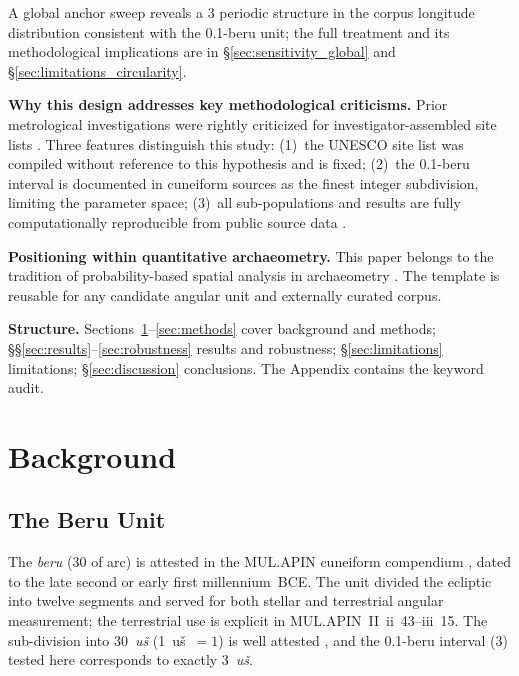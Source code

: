 \documentclass[HARVARD,twocolumn]{USG}
\begin{document}
A global anchor sweep reveals a 3\textdegree{} periodic structure in the
corpus longitude distribution consistent with the 0.1-beru unit; the full
treatment and its methodological implications are in
\S\ref{sec:sensitivity_global} and \S\ref{sec:limitations_circularity}.
\label{sec:circularity}

\textbf{Why this design addresses key methodological criticisms.}
Prior metrological investigations were rightly criticized for investigator-assembled
site lists \citep{williamson1983leylines,freeman1976,kendall1974}.
Three features distinguish this study: (1)~the UNESCO site list was compiled
without reference to this hypothesis and is fixed; (2)~the 0.1-beru interval
is documented in cuneiform sources \citep{hunger2019mul} as the finest
integer subdivision, limiting the parameter space; (3)~all sub-populations 
and results are fully computationally reproducible from public source 
data \citep{tenenbaum2026audit}.

\textbf{Positioning within quantitative archaeometry.}
This paper belongs to the tradition of probability-based spatial analysis in
archaeometry \citep{magli2013,magli2016,ruggles1999astronomy,ruggles2015handbook,silva2020statistical}. 
The template is reusable for any candidate angular unit
and externally curated corpus.

\textbf{Structure.}
Sections~\ref{sec:prior}--\ref{sec:methods} cover background and methods;
\S\S\ref{sec:results}--\ref{sec:robustness} results and robustness;
\S\ref{sec:limitations} limitations;
\S\ref{sec:discussion} conclusions.
The Appendix contains the keyword audit.

\section{Background}
\label{sec:prior}

\subsection{The Beru Unit}
\label{sec:beru}

The \textit{beru} (30\textdegree{} of arc) is attested in the MUL.APIN
cuneiform compendium \citep{hunger2019mul,watson2011writing}, dated to the late
second or early first millennium~BCE. The unit divided the ecliptic into twelve
segments and served for both stellar and terrestrial angular measurement;
the terrestrial use is explicit in MUL.APIN~II~ii~43--iii~15. The sub-division
into 30~\textit{u\v{s}} (1~u\v{s}~$= 1$\textdegree{}) is well attested
\citep{hunger2019mul,robson2008mathematics}, and the 0.1-beru interval
(3\textdegree{}) tested here corresponds to exactly 3~\textit{u\v{s}}.
\end{document}
